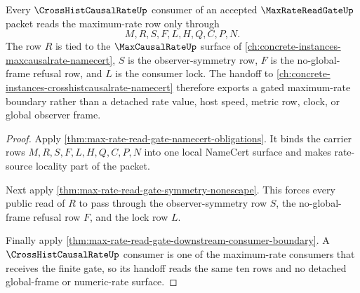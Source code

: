 \begin{theorem}
\label{thm:max-rate-read-gate-cross-hist-causal-rate-handoff}
Every $\CrossHistCausalRateUp$ consumer of an accepted $\MaxRateReadGateUp$ packet reads the maximum-rate row only through
$$
M,R,S,F,L,H,Q,C,P,N.
$$
The row $R$ is tied to the $\MaxCausalRateUp$ surface of \autoref{ch:concrete-instances-maxcausalrate-namecert}, $S$ is the observer-symmetry row, $F$ is the no-global-frame refusal row, and $L$ is the consumer lock. The handoff to \autoref{ch:concrete-instances-crosshistcausalrate-namecert} therefore exports a gated maximum-rate boundary rather than a detached rate value, host speed, metric row, clock, or global observer frame.
\end{theorem}
\begin{proof}
Apply \autoref{thm:max-rate-read-gate-namecert-obligations}. It binds the carrier rows $M,R,S,F,L,H,Q,C,P,N$ into one local NameCert surface and makes rate-source locality part of the packet.

Next apply \autoref{thm:max-rate-read-gate-symmetry-nonescape}. This forces every public read of $R$ to pass through the observer-symmetry row $S$, the no-global-frame refusal row $F$, and the lock row $L$.

Finally apply \autoref{thm:max-rate-read-gate-downstream-consumer-boundary}. A $\CrossHistCausalRateUp$ consumer is one of the maximum-rate consumers that receives the finite gate, so its handoff reads the same ten rows and no detached global-frame or numeric-rate surface.
\end{proof}

